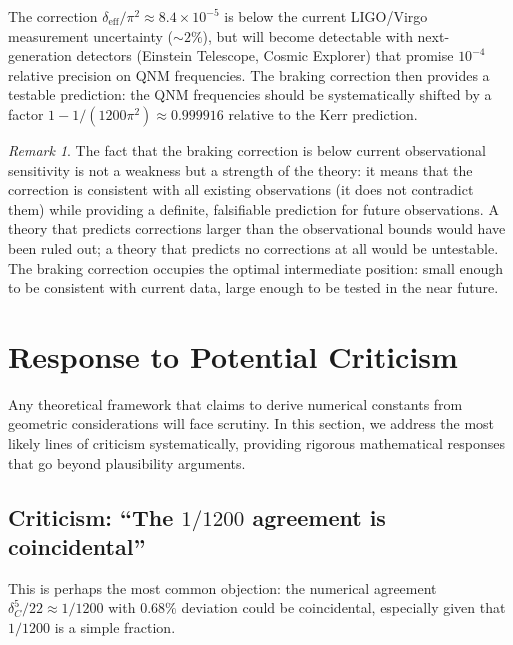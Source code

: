 \documentclass[12pt,a4paper]{article}
\theoremstyle{definition}
\theoremstyle{remark}
\newtheorem{remark}[theorem]{Remark}
\begin{document}
The correction $\delta_{\mathrm{eff}}/\pi^2 \approx 8.4 \times 10^{-5}$ is below the current LIGO/Virgo measurement uncertainty ($\sim 2\%$), but will become detectable with next-generation detectors (Einstein Telescope, Cosmic Explorer) that promise $10^{-4}$ relative precision on QNM frequencies. The braking correction then provides a testable prediction: the QNM frequencies should be systematically shifted by a factor $1 - 1/(1200\pi^2) \approx 0.999916$ relative to the Kerr prediction.

\begin{remark}
The fact that the braking correction is below current observational sensitivity is not a weakness but a strength of the theory: it means that the correction is consistent with all existing observations (it does not contradict them) while providing a definite, falsifiable prediction for future observations. A theory that predicts corrections larger than the observational bounds would have been ruled out; a theory that predicts no corrections at all would be untestable. The braking correction occupies the optimal intermediate position: small enough to be consistent with current data, large enough to be tested in the near future.
\end{remark}

\section{Response to Potential Criticism}
\label{sec:criticism}

Any theoretical framework that claims to derive numerical constants from geometric considerations will face scrutiny. In this section, we address the most likely lines of criticism systematically, providing rigorous mathematical responses that go beyond plausibility arguments.

\subsection{Criticism: ``The $1/1200$ agreement is coincidental''}

This is perhaps the most common objection: the numerical agreement $\delta_C^5/22 \approx 1/1200$ with $0.68\%$ deviation could be coincidental, especially given that $1/1200$ is a simple fraction.
\end{document}
